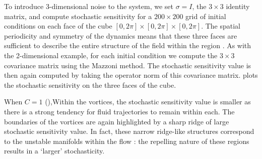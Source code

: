 To introduce 3-dimensional noise to the system, we set \(\sigma = I\), the \(3 \times 3\) identity matrix, and compute stochastic sensitivity for a \(200\times 200\) grid of initial conditions on each face of the cube \([0,2\pi] \times [0,2\pi] \times [0,2\pi]\).
The spatial periodicity and symmetry of the dynamics means that these three faces are sufficient to describe the entire structure of the field within the region \citep{DombreEtAl_1986_ChaoticStreamlinesABC}.
As with the 2-dimensional example, for each initial condition we compute the \(3 \times 3\) covariance matrix using the Mazzoni method.
The stochastic sensitivity value is then again computed by taking the operator norm of this covariance matrix.
 plots the stochastic sensitivity on the three faces of the cube.



When \(C = 1\) (),Within the vortices, the stochastic sensitivity value is smaller as there is a strong tendency for fluid trajectories to remain within each.
The boundaries of the vortices are again highlighted by a sharp ridge of large stochastic sensitivity value.
In fact, these narrow ridge-like structures correspond to the unstable manifolds within the flow \citep{DombreEtAl_1986_ChaoticStreamlinesABC}: the repelling nature of these regions results in a `larger' stochasticity.

